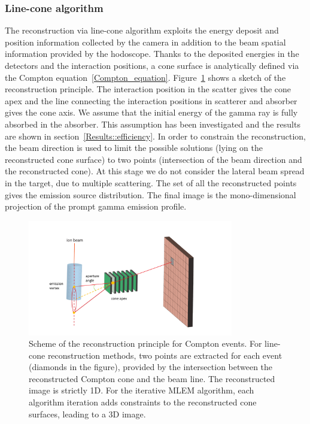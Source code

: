 \subsubsection{Line-cone algorithm}
The reconstruction via line-cone algorithm exploits the energy deposit and position information collected by the camera in addition to the beam spatial information provided by the hodoscope. Thanks to the deposited energies in the detectors and the interaction positions, a cone surface is analytically defined via the Compton equation~\ref{Compton_equation}. Figure~\ref{fig:reconstruction_scheme} shows a sketch of the reconstruction principle. The interaction position in the scatter gives the cone apex and the line connecting the interaction positions in scatterer and absorber gives the cone axis. We assume that the initial energy of the gamma ray is fully absorbed in the absorber. This assumption has been investigated and the results are shown in section~\ref{Results::efficiency}. In order to constrain the reconstruction, the beam direction is used to limit the possible solutions (lying on the reconstructed cone surface) to two points (intersection of the beam direction and the reconstructed cone). At this stage we do not consider the lateral beam spread in the target, due to multiple scattering. The set of all the reconstructed points gives the emission source distribution. The final image is the mono-dimensional projection of the prompt gamma emission profile. 

\begin{figure}
\centering
  \includegraphics[width=0.8\textwidth]{./Figure/reconstruction_scheme}
  \caption{Scheme of the reconstruction principle for Compton events. For line-cone reconstruction methods, two points are extracted for each event (diamonds in the figure), provided by the intersection between the reconstructed Compton cone and the beam line. The reconstructed image is strictly 1D. For the iterative MLEM algorithm, each algorithm iteration adds constraints to the reconstructed cone surfaces, leading to  a 3D image.}	
  \label{fig:reconstruction_scheme}
\end{figure}

